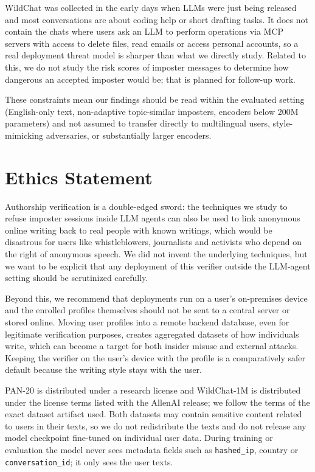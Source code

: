 \documentclass[11pt]{article}
\begin{document}
WildChat was collected in the early days when LLMs were just being released and most conversations are about coding help or short drafting tasks. It does not contain the chats where users ask an LLM to perform operations via MCP servers with access to delete files, read emails or access personal accounts, so a real deployment threat model is sharper than what we directly study. Related to this, we do not study the risk scores of imposter messages to determine how dangerous an accepted imposter would be; that is planned for follow-up work.

These constraints mean our findings should be read within the evaluated setting (English-only text, non-adaptive topic-similar imposters, encoders below 200M parameters) and not assumed to transfer directly to multilingual users, style-mimicking adversaries, or substantially larger encoders.

\section*{Ethics Statement}

Authorship verification is a double-edged sword: the techniques we study to refuse imposter sessions inside LLM agents can also be used to link anonymous online writing back to real people with known writings, which would be disastrous for users like whistleblowers, journalists and activists who depend on the right of anonymous speech. We did not invent the underlying techniques, but we want to be explicit that any deployment of this verifier outside the LLM-agent setting should be scrutinized carefully.

Beyond this, we recommend that deployments run on a user's on-premises device and the enrolled profiles themselves should not be sent to a central server or stored online. Moving user profiles into a remote backend database, even for legitimate verification purposes, creates aggregated datasets of how individuals write, which can become a target for both insider misuse and external attacks. Keeping the verifier on the user's device with the profile is a comparatively safer default because the writing style stays with the user.

PAN-20 is distributed under a research license and WildChat-1M is distributed under the license terms listed with the AllenAI release; we follow the terms of the exact dataset artifact used. Both datasets may contain sensitive content related to users in their texts, so we do not redistribute the texts and do not release any model checkpoint fine-tuned on individual user data. During training or evaluation the model never sees metadata fields such as \texttt{hashed\_ip}, country or \texttt{conversation\_id}; it only sees the user texts.
\end{document}
